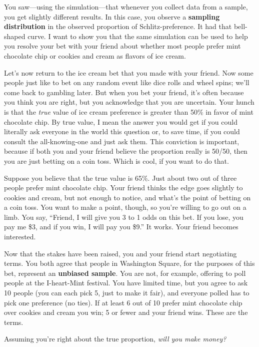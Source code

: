 \documentclass[openany]{book}
\begin{document}
You saw---using the simulation---that whenever you collect data from a sample, you get slightly different results. In this case, you observe a \textbf{sampling distribution} in the observed proportion of Schlitz-preference. It had that bell-shaped curve. I want to show you that the same simulation can be used to help you resolve your bet with your friend about whether most people prefer mint chocolate chip or cookies and cream as flavors of ice cream.

Let's now return to the ice cream bet that you made with your friend. Now some people just like to bet on any random event like dice rolls and wheel spins; we'll come back to gambling later. But when you bet your friend, it's often because you think you are right, but you acknowledge that you are uncertain. Your hunch is that the \emph{true} value of ice cream preference is greater than 50\% in favor of mint chocolate chip. By true value, I mean the answer you would get if you could literally ask everyone in the world this question or, to save time, if you could consult the all-knowing-one and just ask them. This conviction is important, because if both you and your friend believe the proportion really is 50/50, then you are just betting on a coin toss. Which is cool, if you want to do that.

Suppose you believe that the true value is 65\%. Just about two out of three people prefer mint chocolate chip. Your friend thinks the edge goes slightly to cookies and cream, but not enough to notice, and what's the point of betting on a coin toss. You want to make a point, though, so you're willing to go out on a limb. You say, ``Friend, I will give you 3 to 1 odds on this bet. If you lose, you pay me \$3, and if you win, I will pay you \$9.'' It works. Your friend becomes interested.

Now that the stakes have been raised, you and your friend start negotiating terms. You both agree that people in Washington Square, for the purposes of this bet, represent an \textbf{unbiased sample}. You are not, for example, offering to poll people at the I-heart-Mint festival. You have limited time, but you agree to ask 10 people (you can each pick 5, just to make it fair), and everyone polled has to pick one preference (no ties). If at least 6 out of 10 prefer mint chocolate chip over cookies and cream you win; 5 or fewer and your friend wins. These are the terms.

Assuming you're right about the true proportion, \emph{will you make money?}
\end{document}
